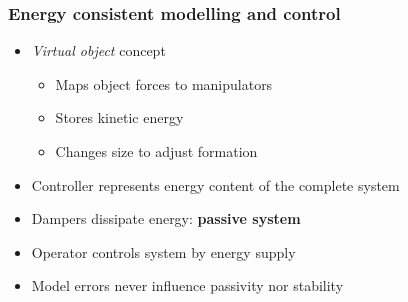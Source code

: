 \documentclass[student]{ITRslides}
\begin{document}
\begin{frame}
	\frametitle{Energy consistent modelling and control}
	\begin{itemize}
		\item \emph{Virtual object} concept
			\begin{itemize}%
  				\renewcommand{\labelitemi}{$\Rightarrow$}
				\item Maps object forces to manipulators
				\item Stores kinetic energy
				\item Changes size to adjust formation
			\end{itemize}
		\item Controller represents energy content of the complete system
		\item Dampers dissipate energy: \textbf{passive system}
		\item Operator controls system by energy  supply
		\item Model errors never influence passivity nor stability
		\end{itemize}


\end{frame}
\end{document}
